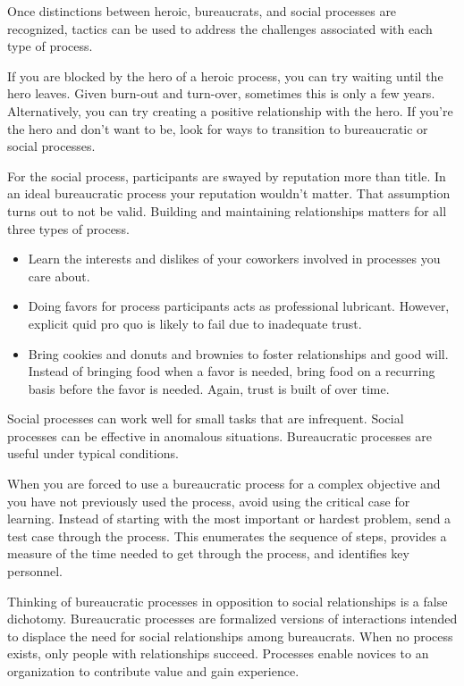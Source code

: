 Once distinctions between heroic, bureaucrats, and social processes are recognized, tactics can be used to address the challenges associated with each type of process.

If you are blocked by the hero of a heroic process, you can try waiting until the hero leaves. Given burn-out and turn-over, sometimes this is only a few years. Alternatively, you can try creating a positive relationship with the hero.  If you're the hero and don't want to be, look for ways to transition to bureaucratic or social processes. 


For the social process, participants are swayed by reputation more than title. In an ideal bureaucratic process your reputation wouldn't matter. That assumption turns out to not be valid. Building and maintaining relationships matters for all three types of process.
\begin{itemize}
    \item Learn the interests and dislikes of your coworkers involved in processes you care about.
    \item Doing favors for process participants acts as professional lubricant. However, explicit quid pro quo is likely to fail due to inadequate trust. 
    \item Bring cookies and donuts and brownies to foster relationships and good will. 
Instead of bringing food when a favor is needed, bring food on a recurring basis before the favor is needed. Again, trust is built of over time. 
\end{itemize}

Social processes can work well for small tasks that are infrequent.
Social processes can be effective in anomalous situations.
Bureaucratic processes are useful under typical conditions.

When you are forced to use a bureaucratic process for a complex objective and you have not previously used the process, avoid using the critical case for learning. Instead of starting with the most important or hardest problem, send a test case through the process. This enumerates the sequence of steps, provides a measure of the time needed to get through the process, and identifies key personnel. 

Thinking of bureaucratic processes in opposition to social relationships is a false dichotomy. Bureaucratic processes are formalized versions of interactions intended to displace the need for social relationships among bureaucrats.
When no process exists, only people with relationships succeed. Processes enable novices to an organization to contribute value and gain experience. 



